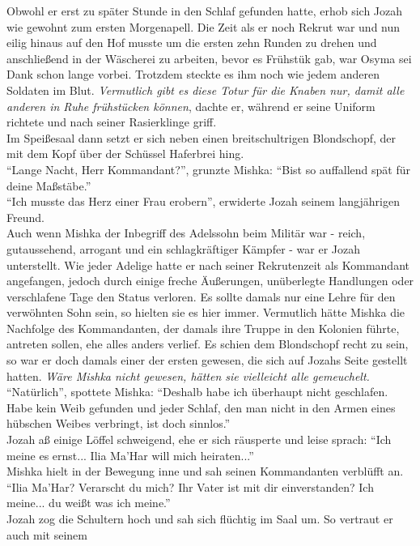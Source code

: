 Obwohl er erst zu später Stunde in den Schlaf gefunden hatte, erhob sich Jozah wie gewohnt zum 
ersten Morgenapell. Die Zeit als er noch Rekrut war und nun eilig hinaus auf den Hof musste um die 
ersten zehn Runden zu drehen und anschließend in der Wäscherei zu arbeiten, bevor es Frühstük gab, 
war Osyma sei Dank schon lange vorbei. Trotzdem steckte es ihm noch wie jedem anderen Soldaten im 
Blut. \textit{Vermutlich gibt es diese Totur für die Knaben nur, damit alle anderen in Ruhe 
frühstücken können}, dachte er, während er seine Uniform richtete und nach seiner Rasierklinge 
griff.\\
Im Speißesaal dann setzt er sich neben einen breitschultrigen Blondschopf, der mit dem Kopf über 
der Schüssel Haferbrei hing.\\
``Lange Nacht, Herr Kommandant?'', grunzte Mishka: ``Bist so auffallend spät für deine Maßstäbe.''\\
``Ich musste das Herz einer Frau erobern'', erwiderte Jozah seinem langjährigen Freund.\\
Auch wenn Mishka der Inbegriff des Adelssohn beim Militär war - reich, gutaussehend, arrogant und 
ein schlagkräftiger Kämpfer - war er Jozah unterstellt. Wie jeder Adelige hatte er nach seiner 
Rekrutenzeit als Kommandant angefangen, jedoch durch einige freche Äußerungen, unüberlegte 
Handlungen oder verschlafene Tage den Status verloren. Es sollte damals nur eine Lehre für den 
verwöhnten Sohn sein, so hielten sie es hier immer. Vermutlich hätte Mishka die Nachfolge des 
Kommandanten, der damals ihre Truppe in den Kolonien führte, antreten sollen, ehe alles anders 
verlief. Es schien dem Blondschopf recht zu sein, so war er doch damals einer der ersten gewesen, 
die sich auf Jozahs Seite gestellt hatten. \textit{Wäre Mishka nicht gewesen, hätten sie vielleicht 
alle gemeuchelt.}\\
``Natürlich'', spottete Mishka: ``Deshalb habe ich überhaupt nicht geschlafen. Habe kein Weib 
gefunden und jeder Schlaf, den man nicht in den Armen eines hübschen Weibes verbringt, ist doch 
sinnlos.''\\
Jozah aß einige Löffel schweigend, ehe er sich räusperte und leise sprach: ``Ich meine es ernst... 
Ilia Ma'Har will mich heiraten...''\\
Mishka hielt in der Bewegung inne und sah seinen Kommandanten verblüfft an. ``Ilia Ma'Har? 
Verarscht du mich? Ihr Vater ist mit dir einverstanden? Ich meine... du weißt was ich meine.''\\
Jozah zog die Schultern hoch und sah sich flüchtig im Saal um. So vertraut er auch mit seinem 
